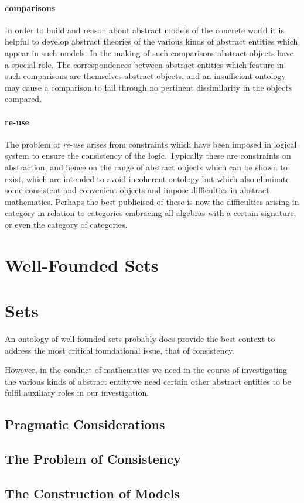 \paragraph{comparisons}

In order to build and reason about abstract models of the concrete world it is helpful to develop abstract theories of the various kinds of abstract entities which appear in such models.
In the making of such comparisons abstract objects have a special role.
The correspondences between abstract entities which feature in such comparisons are themselves abstract objects, and an insufficient ontology may cause a comparison to fail through no pertinent dissimilarity in the objects compared.

\paragraph{re-use}

The problem of \emph{re-use} arises from constraints which have been imposed in logical system to ensure the consistency of the logic.
Typically these are constraints on abstraction, and hence on the range of abstract objects which can be shown to exist, which are intended to avoid incoherent ontology but which also eliminate some consistent and convenient objects and impose difficulties in abstract mathematics.
Perhaps the best publicised of these is now the difficulties arising in category in relation to categories embracing all algebras with a certain signature, or even the category of categories.


\section{Well-Founded Sets}

\section{Sets}

An ontology of well-founded sets probably does provide the best context to address the most critical foundational issue, that of consistency.

However, in the conduct of mathematics we need in the course of investigating the various kinds of abstract entity.we need certain other abstract entities to be fulfil auxiliary roles in our investigation.


\subsection{Pragmatic Considerations}

\subsection{The Problem of Consistency}

\subsection{The Construction of Models} 
